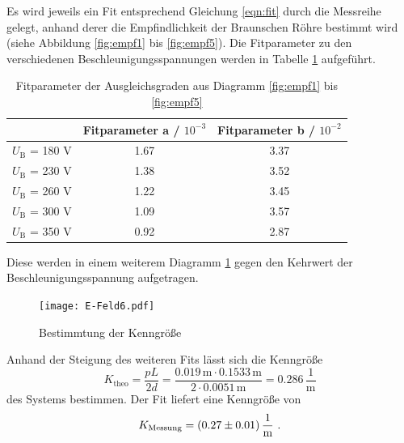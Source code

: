 Es wird jeweils ein Fit entsprechend Gleichung \ref{eqn:fit} durch die Messreihe gelegt, anhand derer die Empfindlichkeit der Braunschen Röhre bestimmt wird (siehe Abbildung \ref{fig:empf1} bis \ref{fig:empf5}). Die Fitparameter zu den verschiedenen Beschleunigungsspannungen werden in Tabelle \ref{tab:fit} aufgeführt. 
\begin{table}[H]
  \centering
  \begin{tabular}{c| c c}
    \toprule
    &Fitparameter a / $10^{-3}$ & Fitparameter b / $10^{-2}$\\
  \midrule
    $U_\text{B}$ = 180 V & 1.67	& 3.37 	\\
    $U_\text{B}$ = 230 V & 1.38	& 3.52	\\
    $U_\text{B}$ = 260 V & 1.22	& 3.45	\\
    $U_\text{B}$ = 300 V & 1.09	& 3.57	\\
    $U_\text{B}$ = 350 V & 0.92	& 2.87	\\
  \toprule
  \end{tabular}
  \caption{Fitparameter der Ausgleichsgraden aus Diagramm \ref{fig:empf1} bis \ref{fig:empf5}}
  \label{tab:fit}
\end{table}
Diese werden in einem weiterem Diagramm \ref{fig:K} gegen den Kehrwert der Beschleunigungsspannung aufgetragen.
\begin{figure}
  \centering
  \texttt{[image: E-Feld6.pdf]}
  \caption{Bestimmtung der Kenngröße}
  \label{fig:K}
\end{figure}
Anhand der Steigung des weiteren Fits lässt sich die Kenngröße
\begin{equation}
  K_\text{theo} = \frac{p L}{2 d} = \frac{0.019 \, \text{m} \cdot 0.1533 \, \text{m}}{2 \cdot 0.0051 \, \text{m}} = 0.286 \, \frac{1}{\text{m}}
  \label{eqn:Ktheo}
\end{equation}
des Systems bestimmen. Der Fit liefert eine Kenngröße von
\begin{equation}
  K_\text{Messung} = (\num{0.27 +- 0.01}) \, \frac{1}{\text{m}} \ .
  \label{Kmess}
\end{equation}
